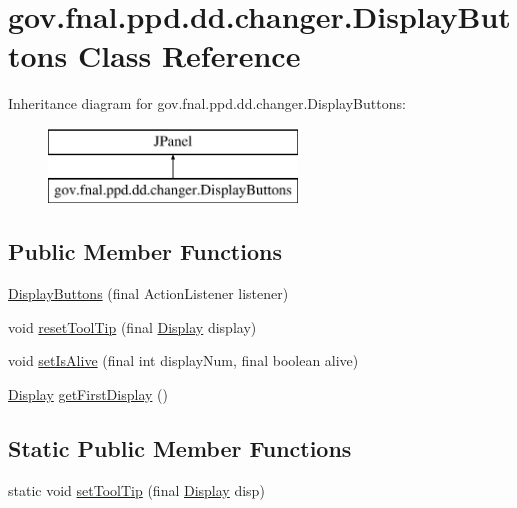 \hypertarget{classgov_1_1fnal_1_1ppd_1_1dd_1_1changer_1_1DisplayButtons}{\section{gov.\-fnal.\-ppd.\-dd.\-changer.\-Display\-Buttons Class Reference}
\label{classgov_1_1fnal_1_1ppd_1_1dd_1_1changer_1_1DisplayButtons}
}
Inheritance diagram for gov.\-fnal.\-ppd.\-dd.\-changer.\-Display\-Buttons\-:\begin{figure}[H]
\begin{center}
\leavevmode
\includegraphics[height=2.000000cm]{classgov_1_1fnal_1_1ppd_1_1dd_1_1changer_1_1DisplayButtons}
\end{center}
\end{figure}
\subsection*{Public Member Functions}
\begin{DoxyCompactItemize}
\item 
\hyperlink{classgov_1_1fnal_1_1ppd_1_1dd_1_1changer_1_1DisplayButtons_a3ac04af83dc6cf06f9189b85817c6e2f}{Display\-Buttons} (final Action\-Listener listener)
\item 
void \hyperlink{classgov_1_1fnal_1_1ppd_1_1dd_1_1changer_1_1DisplayButtons_ac924a30ee1e2898ea503268668d26806}{reset\-Tool\-Tip} (final \hyperlink{interfacegov_1_1fnal_1_1ppd_1_1dd_1_1signage_1_1Display}{Display} display)
\item 
void \hyperlink{classgov_1_1fnal_1_1ppd_1_1dd_1_1changer_1_1DisplayButtons_ac3046bb71b1529e3afc7bf5395495176}{set\-Is\-Alive} (final int display\-Num, final boolean alive)
\item 
\hyperlink{interfacegov_1_1fnal_1_1ppd_1_1dd_1_1signage_1_1Display}{Display} \hyperlink{classgov_1_1fnal_1_1ppd_1_1dd_1_1changer_1_1DisplayButtons_a98d2836ddfbad3b37a3e21fdf3c5f8d2}{get\-First\-Display} ()
\end{DoxyCompactItemize}
\subsection*{Static Public Member Functions}
\begin{DoxyCompactItemize}
\item 
static void \hyperlink{classgov_1_1fnal_1_1ppd_1_1dd_1_1changer_1_1DisplayButtons_a2ed67969ae9a00aa1c744c2862a53307}{set\-Tool\-Tip} (final \hyperlink{interfacegov_1_1fnal_1_1ppd_1_1dd_1_1signage_1_1Display}{Display} disp)
\end{DoxyCompactItemize}
